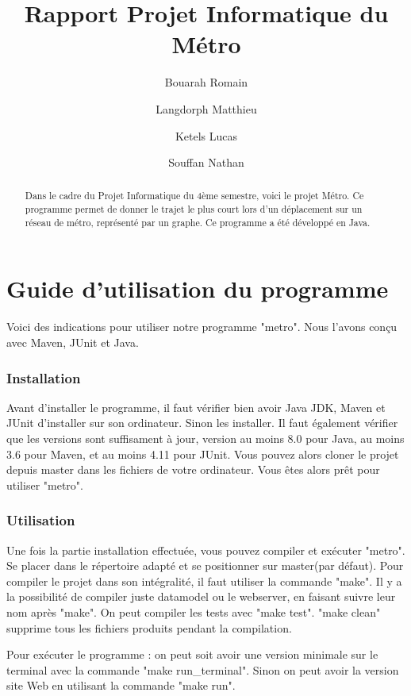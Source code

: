 \documentclass[french, 12pt]{article}
\title{Rapport Projet Informatique du Métro}
\author{
  Bouarah Romain \and
  Langdorph Matthieu \and
  Ketels Lucas \and
  Souffan Nathan
}
\begin{document}
\maketitle
\begin{abstract}
  Dans le cadre du Projet Informatique du 4ème semestre, voici le projet Métro.
  Ce programme permet de donner le trajet le plus court lors d'un déplacement sur un réseau de métro, représenté par un graphe.
  Ce programme a été développé en Java.
\end{abstract}



\newpage
\tableofcontents



\newpage
\part{Guide d'utilisation du programme}
Voici des indications pour utiliser notre programme "metro". Nous l'avons conçu avec Maven, JUnit et Java.

\section{Installation}
Avant d'installer le programme, il faut vérifier bien avoir Java JDK, Maven et JUnit d'installer sur son ordinateur. Sinon les installer. Il faut également vérifier que les versions sont suffisament à jour, version au moins 8.0 pour Java, au moins 3.6 pour Maven, et au moins 4.11 pour JUnit.
Vous pouvez alors cloner le projet depuis master dans les fichiers de votre ordinateur.
Vous êtes alors prêt pour utiliser "metro".

\section{Utilisation}
Une fois la partie installation effectuée, vous pouvez compiler et exécuter "metro".
Se placer dans le répertoire adapté et se positionner sur master(par défaut).
Pour compiler le projet dans son intégralité, il faut utiliser la commande "make".
Il y a la possibilité de compiler juste datamodel ou le webserver, en faisant suivre leur nom après "make".
On peut compiler les tests avec "make test".
"make clean" supprime tous les fichiers produits pendant la compilation.

Pour exécuter le programme : on peut soit avoir une version minimale sur le terminal avec la commande "make run\_terminal". Sinon on peut avoir la version site Web en utilisant la commande "make run".
\end{document}
